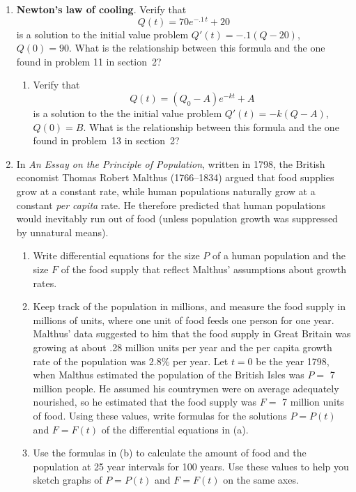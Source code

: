 \begin{enumerate}
\item {\bf Newton's law of cooling}.  Verify that
	\[
Q(t)=70e^{-.1\,t} + 20
\]
is a solution to the initial value problem $Q'(t) = -.1(Q-20)$, $Q(0) = 90$.  What is the relationship between this formula and the one found in problem 11 in section~2?

  \begin{enumerate}
  \item Verify that
\[
Q(t)=(Q_0-A)e^{-kt} + A
\]
is a solution to the the initial value problem $Q'(t)=-k(Q-A)$,
\mbox{$Q(0)=B$}.  What is the relationship between this formula and the one
found in problem~13 in section~2?



\end{enumerate}
\item In {\em An Essay on the Principle of Population}, written in
1798, the British economist Thomas Robert Malthus
(1766--1834) argued that food supplies grow at a
constant rate, while human populations naturally grow at a constant
{\em per capita} rate.  He therefore predicted that human populations
would inevitably run out of food (unless population growth was
suppressed by unnatural means).

  \begin{enumerate}
  \item Write differential equations for the size $P$ of a human population and the size $F$ of the food supply that reflect Malthus' assumptions about growth rates.

  \item Keep track of the population in millions, and measure the food supply in millions of units, where one unit of food feeds one person for one year.  Malthus' data suggested to him that the food supply in Great Britain was growing at about .28 million units per year and the per capita growth rate of the population was 2.8\% per year.  Let $t=0$ be the year 1798, when  Malthus estimated the population of the British Isles was  $P=$ 7 million people.  He assumed his countrymen were on average adequately nourished, so he estimated that the food supply was $F=$ 7 million units of food.  Using these values, write formulas for the solutions $P=P(t)$ and $F=F(t)$ of the differential equations in (a).

  \item Use the formulas in (b) to calculate the amount of food and the population at 25 year intervals for 100 years.  Use these values to help you sketch graphs of $P=P(t)$ and $F=F(t)$ on the same axes.


\end{enumerate}
\end{enumerate}
